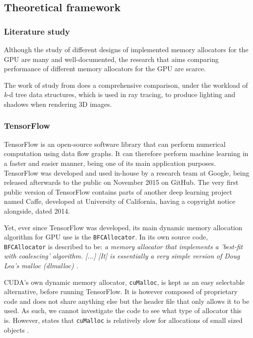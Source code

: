 \documentclass[12pt,twoside]{article}
\begin{document}
\subsection{Theoretical framework}
\label{sec:theoretical-framework}

\subsubsection*{Literature study}

Although the study of different designs of implemented memory allocators for the GPU are many and well-documented, the research that aims comparing performance of different memory allocators for the GPU are scarce. 

The work of \citeauthor{Vinkler2015} study from \citeyear{Vinkler2015} does a comprehensive comparison, under the workload of \textit{k}-d tree data structures, which is used in ray tracing, to produce lighting and shadows when rendering 3D images.


\subsubsection*{TensorFlow}

TensorFlow is an open-source software library that can perform numerical computation using data flow graphs. It can therefore perform machine learning in a faster and easier manner, being one of its main application purposes. TensorFlow was developed and used in-house by a research team at Google, being released afterwards to the public on November 2015 on GitHub. The very first public version of TensorFlow contains parts of another deep learning project named Caffe, developed at University of California, having a copyright notice alongside, dated 2014.

Yet, ever since TensorFlow was developed, its main dynamic memory allocation algorithm for GPU use is the \texttt{BFCAllocator}. In its own source code, \texttt{BFCAllocator} is described to be: \textit{a memory allocator that implements a 'best-fit with coalescing' algorithm.  [...] [It] is essentially a very simple version of Doug Lea's malloc (dlmalloc) \cite{dlmalloc}}.

CUDA's own dynamic memory allocator, \texttt{cuMalloc}, is kept as an easy selectable alternative, before running TensorFlow. It is however composed of proprietary code and does not share anything else but the header file that only allows it to be used. As such, we cannot investigate the code to see what type of allocator this is. However, \citeauthor{Vinkler2015} states that \texttt{cuMalloc} is relatively slow for allocations of small sized objects \cite{Vinkler2015}.
\end{document}
